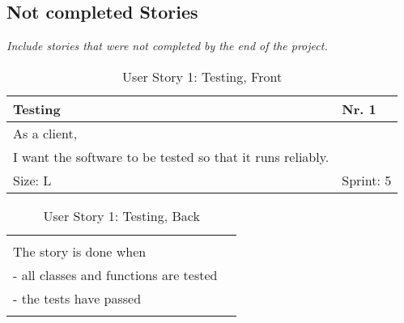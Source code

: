 \subsection*{Not completed Stories}
\emph{Include stories that were not completed by the end of the project.}

\begin{table}[H]
  \caption{User Story 1: Testing, Front}
  \label{Story_1_Front}
  \centering
  \begin{tabular}{|p{9cm} p{2cm}|}
	\hline  	
  	Testing & Nr. 1 \\ 
  	\hline
  	As a client, &    \\ 
  	I want the software to be tested so that it runs reliably. &    \\ 
  	Size: L & Sprint: 5 \\ 
  	\hline
  \end{tabular}
\end{table}
\begin{table}[H]
  \caption{User Story 1: Testing, Back}
  \label{Story_1_Back}
  \centering
  \begin{tabular}{|p{10cm} p{1cm}|}
  \hline
  	  &    \\ 
  	The story is done when &    \\ 
  	 - all classes and functions are tested & \\ 
  	 - the tests have passed & \\ 
  	 
  	  &  
  	   \\ 
  	\hline
  \end{tabular}
\end{table} 

\ \\ 

